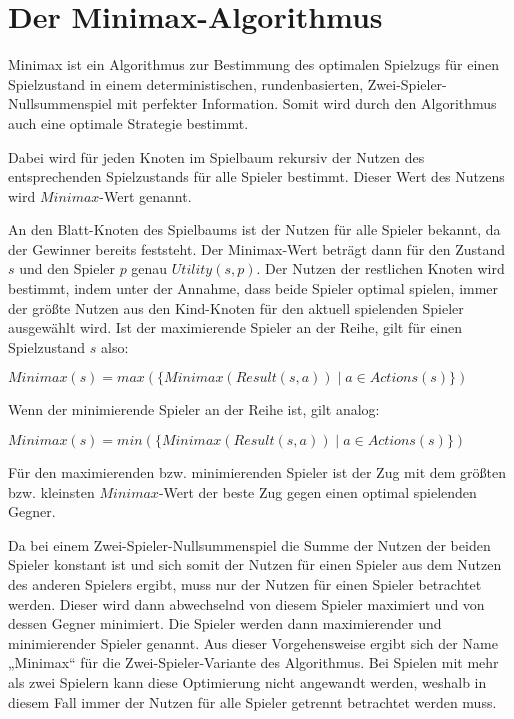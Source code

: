 \section{Der Minimax-Algorithmus}
\label{sec:minimax}

Minimax ist ein Algorithmus zur Bestimmung des optimalen Spielzugs für einen Spielzustand in einem deterministischen,
rundenbasierten, Zwei-Spieler-Nullsummenspiel mit perfekter Information. Somit wird durch den Algorithmus auch eine
optimale Strategie bestimmt.

Dabei wird für jeden Knoten im Spielbaum rekursiv der Nutzen des entsprechenden Spielzustands für alle
Spieler bestimmt. Dieser Wert des Nutzens wird $Minimax$-Wert genannt.

An den Blatt-Knoten des Spielbaums ist der Nutzen für alle Spieler bekannt, da der Gewinner bereits feststeht. Der
Minimax-Wert beträgt dann für den Zustand $s$ und den Spieler $p$ genau $Utility(s, p)$. Der Nutzen der restlichen Knoten
wird bestimmt, indem unter der Annahme, dass beide Spieler optimal spielen, immer der größte Nutzen aus den Kind-Knoten
für den aktuell spielenden Spieler ausgewählt wird. Ist der maximierende Spieler an der Reihe, gilt für einen
Spielzustand $s$ also:

\hspace*{1.3cm}
$Minimax(s)=max(\{Minimax(Result(s, a)) \mid a \in Actions(s)\})$

Wenn der minimierende Spieler an der Reihe ist, gilt analog:

\hspace*{1.3cm}
$Minimax(s)=min(\{Minimax(Result(s, a)) \mid a \in Actions(s)\})$

Für den maximierenden bzw. minimierenden Spieler ist der Zug mit dem größten bzw. kleinsten $Minimax$-Wert der beste Zug
gegen einen optimal spielenden Gegner.
\cite[S.~164f.]{ai2010russel}

Da bei einem Zwei-Spieler-Nullsummenspiel die Summe der Nutzen der beiden Spieler konstant ist und sich somit der
Nutzen für einen Spieler aus dem Nutzen des anderen Spielers ergibt, muss nur der Nutzen für einen Spieler betrachtet
werden. Dieser wird dann abwechselnd von diesem Spieler maximiert und von dessen Gegner minimiert. Die Spieler werden
dann maximierender und minimierender Spieler genannt. Aus dieser Vorgehensweise ergibt sich der Name „Minimax“
für die Zwei-Spieler-Variante des Algorithmus. Bei Spielen mit mehr als zwei Spielern kann diese Optimierung nicht
angewandt werden, weshalb in diesem Fall immer der Nutzen für alle Spieler getrennt betrachtet werden muss.
\cite[S.~165]{ai2010russel}
